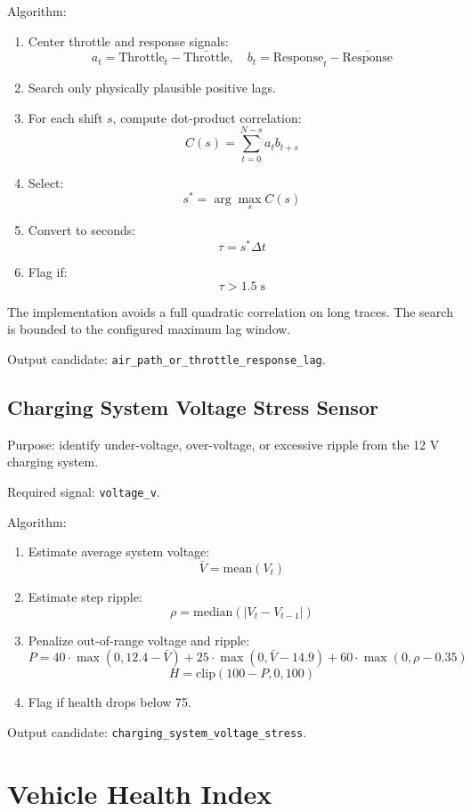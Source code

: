 \documentclass[11pt,a4paper]{article}
\begin{document}
Algorithm:

\begin{enumerate}
\item Center throttle and response signals:
\[
a_t = \mathrm{Throttle}_t - \bar{\mathrm{Throttle}}, \quad b_t = \mathrm{Response}_t - \bar{\mathrm{Response}}
\]
\item Search only physically plausible positive lags.
\item For each shift \(s\), compute dot-product correlation:
\[
C(s) = \sum_{t=0}^{N-s} a_t b_{t+s}
\]
\item Select:
\[
s^* = \arg\max_s C(s)
\]
\item Convert to seconds:
\[
\tau = s^* \Delta t
\]
\item Flag if:
\[
\tau > 1.5 \; \mathrm{s}
\]
\end{enumerate}

The implementation avoids a full quadratic correlation on long traces. The search is bounded to the configured maximum lag window.

Output candidate: \texttt{air\_path\_or\_throttle\_response\_lag}.

\subsection{Charging System Voltage Stress Sensor}

Purpose: identify under-voltage, over-voltage, or excessive ripple from the 12 V charging system.

Required signal: \texttt{voltage\_v}.

Algorithm:

\begin{enumerate}
\item Estimate average system voltage:
\[
\bar{V} = \mathrm{mean}(V_t)
\]
\item Estimate step ripple:
\[
\rho = \mathrm{median}(|V_t - V_{t-1}|)
\]
\item Penalize out-of-range voltage and ripple:
\[
P = 40 \cdot \max(0, 12.4-\bar{V}) + 25 \cdot \max(0, \bar{V}-14.9) + 60 \cdot \max(0, \rho-0.35)
\]
\[
H = \mathrm{clip}(100 - P, 0, 100)
\]
\item Flag if health drops below 75.
\end{enumerate}

Output candidate: \texttt{charging\_system\_voltage\_stress}.

\section{Vehicle Health Index}
\end{document}
